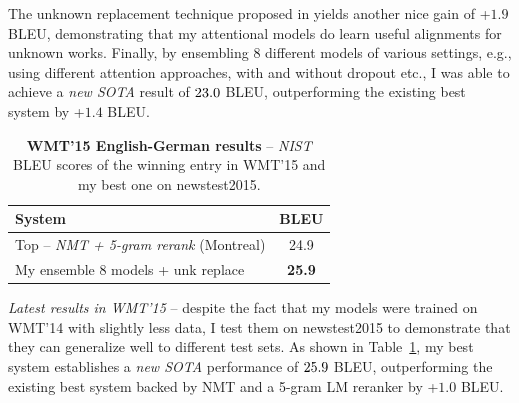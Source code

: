 The unknown replacement technique proposed in \cite{luong15,jean15} yields another nice
gain of +$1.9$ BLEU, demonstrating that my attentional models
do learn useful alignments for unknown works. Finally, by ensembling 8 different
models of various settings, e.g., using different attention approaches, with
and without dropout etc., I was able to achieve a {\it new SOTA} result of
$23.0{}$
BLEU, outperforming the existing best system \cite{jean15} by +$1.4$ BLEU.

\begin{table}[tbh!]
\centering
\begin{tabular}{l|c}
\bf{System} & \bf{BLEU}\\
  \hline
Top -- {\it NMT + 5-gram rerank} (Montreal) & 24.9 \\
  \hline
My ensemble 8 models + unk replace & {\bf 25.9} \\
\end{tabular}
\caption[WMT'15 English-German results]{{\bf WMT'15 English-German results} -- {\it NIST} BLEU scores of the
winning entry in WMT'15 and my best one on newstest2015.}
\label{t:wmt15ende}
\end{table}

{\it Latest results in WMT'15} -- despite the fact that my models were trained
on WMT'14 with slightly less data, I test them on newstest2015 to demonstrate
that they can generalize well to different test sets. As shown in Table~\ref{t:wmt15ende}, my best
system establishes a {\it new SOTA} performance of $25.9{}$ BLEU,
outperforming the existing best system backed by NMT and a 5-gram LM reranker
by +$1.0$
BLEU.

